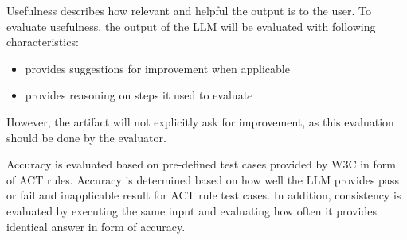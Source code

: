 Usefulness describes how relevant and helpful the output is to the user. To evaluate usefulness, the output of the LLM will be evaluated with following characteristics: 

\begin{itemize}
    \item provides suggestions for improvement when applicable
    \item provides reasoning on steps it used to evaluate
\end{itemize}

However, the artifact will not explicitly ask for improvement, as this evaluation should be done by the evaluator. 

Accuracy is evaluated based on pre-defined test cases provided by W3C in form of ACT rules. Accuracy is determined based on how well the LLM provides pass or fail and inapplicable result for ACT rule test cases. In addition, consistency is evaluated by executing the same input and evaluating how often it provides identical answer in form of accuracy. 

